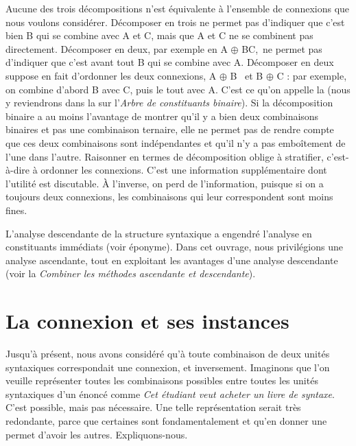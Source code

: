 Aucune des trois décompositions n’est équivalente à l’ensemble de connexions que nous voulons considérer. Décomposer en trois ne permet pas d’indiquer que c’est bien B qui se combine avec A et C, mais que A et C ne se combinent pas directement. Décomposer en deux, par exemple en A ${\oplus}$ BC,~ne permet pas d’indiquer que c’est avant tout B qui se combine avec A. Décomposer en deux suppose en fait d’ordonner les deux connexions, A ${\oplus}$ B~ et B ${\oplus}$ C : par exemple, on combine d’abord B avec C, puis le tout avec A. C’est ce qu’on appelle la  (nous y reviendrons dans la  sur l’\textit{Arbre de constituants binaire}). Si la décomposition binaire a au moins l’avantage de montrer qu’il y a bien deux combinaisons binaires et pas une combinaison ternaire, elle ne permet pas de rendre compte que ces deux combinaisons sont indépendantes et qu’il n’y a pas emboîtement de l’une dans l’autre. Raisonner en termes de décomposition oblige à stratifier, c’est-à-dire à ordonner les connexions. C’est une information supplémentaire dont l’utilité est discutable. À l’inverse, on perd de l’information, puisque si on a toujours deux connexions, les combinaisons qui leur correspondent sont moins fines.

L’analyse descendante de la structure syntaxique a engendré l’analyse en constituants immédiats (voir  éponyme). Dans cet ouvrage, nous privilégions une analyse ascendante, tout en exploitant les avantages d’une analyse descendante (voir la  \textit{Combiner les méthodes ascendante et descendante}).

\section{La connexion et ses instances}\label{sec:3.2.14}

Jusqu’à présent, nous avons considéré qu’à toute combinaison de deux unités syntaxiques correspondait une connexion, et inversement. Imaginons que l’on veuille représenter toutes les combinaisons possibles entre toutes les unités syntaxiques d’un énoncé comme \textit{Cet étudiant veut acheter un livre de syntaxe}. C’est possible, mais pas nécessaire. Une telle représentation serait très redondante, parce que certaines  sont fondamentalement  et qu’en donner une permet d’avoir les autres. Expliquons-nous.

